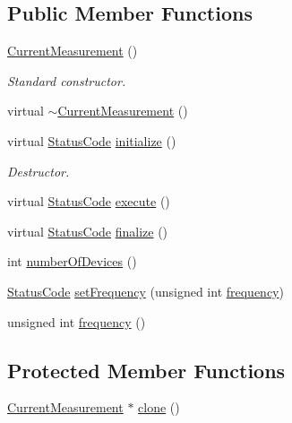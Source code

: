\subsection*{Public Member Functions}
\begin{DoxyCompactItemize}
\item 
\hyperlink{classCurrentMeasurement_ad89184bc1f2386b71051d7976ec662f1}{Current\+Measurement} ()
\begin{DoxyCompactList}\small\item\em Standard constructor. \end{DoxyCompactList}\item 
virtual \hyperlink{classCurrentMeasurement_a86c291508b913b4b028567eeb8995c83}{$\sim$\+Current\+Measurement} ()
\item 
virtual \hyperlink{classStatusCode}{Status\+Code} \hyperlink{classCurrentMeasurement_a88d397682cb5847d5710d08544b6f4c6}{initialize} ()
\begin{DoxyCompactList}\small\item\em Destructor. \end{DoxyCompactList}\item 
virtual \hyperlink{classStatusCode}{Status\+Code} \hyperlink{classCurrentMeasurement_a19ae0dcc63b4151ceebe0bf2c42da948}{execute} ()
\item 
virtual \hyperlink{classStatusCode}{Status\+Code} \hyperlink{classCurrentMeasurement_af87fa329a11212c10e878568bcecaeb3}{finalize} ()
\item 
int \hyperlink{classCurrentMeasurement_a646a9953d7aef3bad2e2dacaab31c241}{number\+Of\+Devices} ()
\item 
\hyperlink{classStatusCode}{Status\+Code} \hyperlink{classCurrentMeasurement_ae990f376398bc25891eaddcb245fdf46}{set\+Frequency} (unsigned int \hyperlink{classCurrentMeasurement_ae7c60d0b14808000df5f1d633e0ca990}{frequency})
\item 
unsigned int \hyperlink{classCurrentMeasurement_ae7c60d0b14808000df5f1d633e0ca990}{frequency} ()
\end{DoxyCompactItemize}
\subsection*{Protected Member Functions}
\begin{DoxyCompactItemize}
\item 
\hyperlink{classCurrentMeasurement_1_1CurrentMeasurement}{Current\+Measurement} $\ast$ \hyperlink{classCurrentMeasurement_a7722435fcc404fe4761c3fa96f3b6338}{clone} ()
\end{DoxyCompactItemize}
